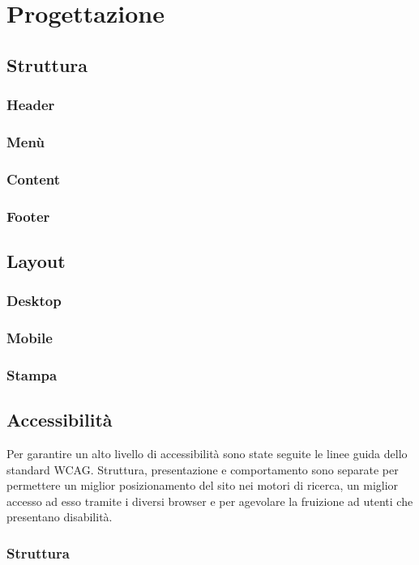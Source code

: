 \documentclass[12pt,a4paper,headings=optiontohead]{article}
\begin{document}
\section{Progettazione}
\subsection{Struttura}
\subsubsection{Header}
\subsubsection{Menù}
\subsubsection{Content}
\subsubsection{Footer}

\subsection{Layout}
\subsubsection{Desktop}
\subsubsection{Mobile}
\subsubsection{Stampa}

\subsection{Accessibilità}
Per garantire un alto livello di accessibilità sono state seguite le linee guida dello standard WCAG. Struttura, presentazione e comportamento sono separate per permettere un miglior posizionamento del sito nei motori di ricerca, un miglior accesso ad esso tramite i diversi browser e per agevolare la fruizione ad utenti che presentano disabilità.
\subsubsection{Struttura}
\end{document}
